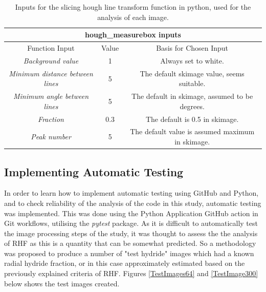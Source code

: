 \documentclass{article}
\begin{document}
\begin{table}
	\begin{center}
	\begin{tabular}{ |c|c|c| } 
		\hline
		\multicolumn{3}{|c|}{hough\_measurebox inputs} \\
		\hline
		Function Input & Value & Basis for Chosen Input \\
		\hline
		\textit{Background value} & 1 & Always set to white. \\
		\hline
		\textit{Minimum distance between lines} & 5 & The default skimage value, seems suitable. \\ 
		\hline
		\textit{Minimum angle between lines} & 5 & The default in skimage, assumed to be degrees. \\
		\hline
		\textit{Fraction} & 0.3 & The default is 0.5 in skimage. \\ 
		\hline
		\textit{Peak number} & 5 & The default value is assumed maximum in skimage. \\ 
		\hline
	\end{tabular}
	\caption{Inputs for the slicing hough line transform function in python, used for the analysis of each image.}
	\label{HoughmeasureboxInputs}
	\end{center}
\end{table}

\subsection{Implementing Automatic Testing}
In order to learn how to implement automatic testing using GitHub and Python, and to check reliability of the analysis of the code in this study, automatic testing was implemented. This was done using the Python Application GitHub action in Git workflows, utilising the \textit{pytest} package. As it is difficult to automatically test the image processing steps of the study, it was thought to assess the the analysis of RHF as this is a quantity that can be somewhat predicted. So a methodology was proposed to produce a number of "test hydride" images which had a known radial hydride fraction, or in this case approximately estimated based on the previously explained criteria of RHF. Figures \ref{TestImages64} and \ref{TestImage300} below shows the test images created.
\end{document}
